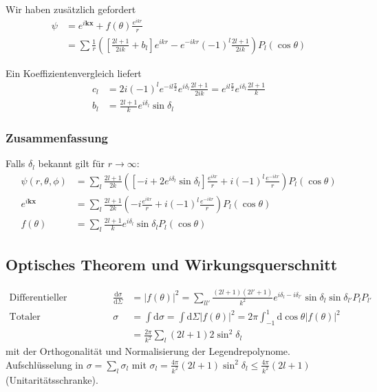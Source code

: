 \documentclass[11pt,a4paper]{report}
\begin{document}
Wir haben zusätzlich gefordert
\begin{align*}
    \psi &= e^{i \mathbf{k} \mathbf{x}} + f(\theta) \frac{e^{i k r}}{r} \\
    &= \sum \frac{1}{r} \left(\left[ \frac{2 l + 1}{2 i k} + b_l \right] e^{i k r} - e^{-i k r} (-1)^l \frac{2 l + 1} {2 i k}\right) P_l(\cos \theta)
\end{align*}

Ein Koeffizientenvergleich liefert 
\begin{align*}
    c_l &= 2 i (-1)^l e^{-i l \frac{\pi}{2}} e^{i \delta_l} \frac{2 l + 1}{2 i k} = e^{i l \frac{\pi}{2}} e^{i \delta_l} \frac{2 l + 1}{k} \\
    b_l &= \frac{2 l + 1}{k} e^{i \delta_l} \sin \delta_l
\end{align*}

\subsubsection{Zusammenfassung}

Falls $\delta_l$ bekannt gilt für $r \rightarrow \infty$:
\begin{align*}
    \psi(r, \theta, \phi) &= \sum_l \frac{2 l + 1}{2 k} \left( \left[ -i + 2 e^{i \delta_l} \sin \delta_l \right] \frac{e^{i k r}}{r} + i (-1)^l \frac{e^{-i k r}}{r}\right) P_l(\cos \theta) \\
    e^{i \mathbf{k} \mathbf{x}} &= \sum_l \frac{2 l + 1}{2 k} \left( -i \frac{e^{i k r}}{r} + i (-1)^l \frac{e^{-i k r}}{r}\right) P_l(\cos \theta) \\
    f(\theta) &= \sum_l \frac{2 l + 1}{ k}  e^{i \delta_l} \sin \delta_l  P_l(\cos \theta) 
\end{align*}

\subsection{Optisches Theorem und Wirkungsquerschnitt}

\begin{align*}
    \text{Differentieller Wirkungsquerschnitt} && \frac{\mathrm{d} \sigma}{\mathrm{d} \Sigma} &= |f(\theta)|^2 = \sum_{l l'} \frac{(2 l + 1)(2 l' + 1)}{k^2} e^{i \delta_l - i \delta_{l'}} \sin \delta_l \sin \delta_{l'} P_l P_{l'} \\
    \text{Totaler Wirkungsquerschnitt} && \sigma &= \int \mathrm{d}\sigma = \int \mathrm{d} \Sigma |f(\theta)|^2 = 2\pi \int_{-1}^1 \mathrm{d}\cos \theta |f(\theta)|^2 \\
    &&&=\frac{2\pi}{k^2} \sum_l (2 l + 1) 2 \sin^2 \delta_l 
\end{align*}
mit der Orthogonalität und Normalisierung der Legendrepolynome.
Aufschlüsselung in $\sigma = \sum_l \sigma_l$ mit $\sigma_l = \frac{4\pi}{k^2} (2 l + 1) \sin^2  \delta_l \leq \frac{4\pi}{k^2} (2 l + 1)$ (Unitaritätsschranke).
\end{document}
